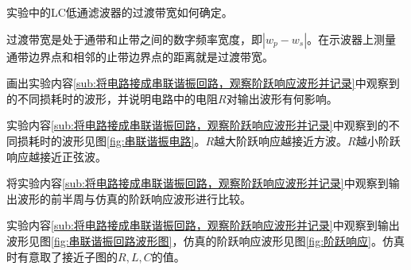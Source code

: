 \begin{Exercise}
	实验中的LC低通滤波器的过渡带宽如何确定。
\end{Exercise}

\begin{Answer}
	过渡带宽是处于通带和止带之间的数字频率宽度，即$ |w_p-w_s| $。在示波器上测量通带边界点和相邻的止带边界点的距离就是过渡带宽。
\end{Answer}

\begin{Exercise}
	画出实验内容\ref{sub:将电路接成串联谐振回路，观察阶跃响应波形并记录}中观察到的不同损耗时的波形，并说明电路中的电阻$ R $对输出波形有何影响。
\end{Exercise}

\begin{Answer}
	实验内容\ref{sub:将电路接成串联谐振回路，观察阶跃响应波形并记录}中观察到的不同损耗时的波形见图\ref{fig:串联谐振电路}。$ R $越大阶跃响应越接近方波。$ R $越小阶跃响应越接近正弦波。
\end{Answer}

\begin{Exercise}
	将实验内容\ref{sub:将电路接成串联谐振回路，观察阶跃响应波形并记录}中观察到输出波形的前半周与仿真的阶跃响应波形进行比较。
\end{Exercise}

\begin{Answer}
	实验内容\ref{sub:将电路接成串联谐振回路，观察阶跃响应波形并记录}中观察到输出波形见图\ref{fig:串联谐振回路波形图}，仿真的阶跃响应波形见图\ref{fig:阶跃响应}。仿真时有意取了接近子图的$ R, L, C $的值。
\end{Answer}

